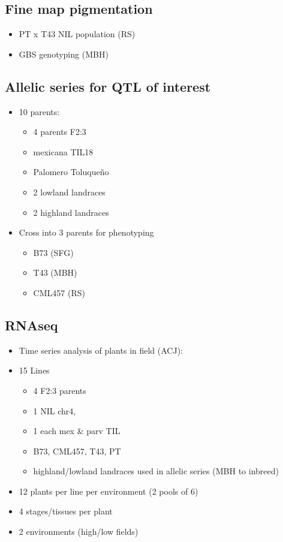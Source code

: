 \subsection{Fine map pigmentation}
\begin{itemize}
\item PT x T43 NIL population (RS)
\item GBS genotyping (MBH)
\end{itemize}

\subsection{Allelic series for QTL of interest}
\begin{itemize}
\item 10 parents:
\begin{itemize}
\item 4 parents F2:3
\item mexicana TIL18
\item Palomero Toluqueño
\item 2 lowland landraces
\item 2 highland landraces
\end{itemize}
\item Cross into 3 parents for phenotyping
\begin{itemize}
\item B73 (SFG)
\item T43 (MBH)
\item CML457 (RS)
\end{itemize}
\end{itemize}

\subsection{RNAseq}
\begin{itemize}
\item Time series analysis of plants in field (ACJ):
\item 15 Lines
\begin{itemize}
\item 4 F2:3 parents
\item 1 NIL chr4,
\item 1 each mex \& parv TIL
\item B73, CML457, T43, PT
\item highland/lowland landraces used in allelic series (MBH to inbreed)
\end{itemize}
\item 12 plants per line per environment (2 pools of 6)
\item 4 stages/tissues per plant
\item 2 environments (high/low fields)
\end{itemize}

